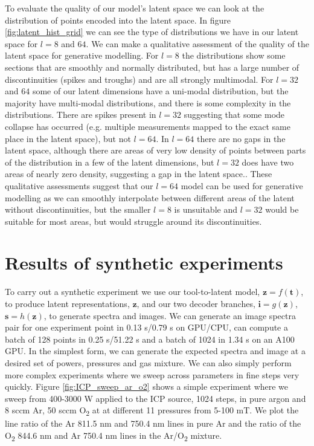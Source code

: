 \documentclass[10pt]{iopart}
\begin{document}
To evaluate the quality of our model's latent space we can look at the distribution of points encoded into the latent space. In figure \ref{fig:latent_hist_grid} we can see the type of distributions we have in our latent space for $l = 8$ and $64$. We can make a qualitative assessment of the quality of the latent space for generative modelling. For $l = 8$ the distributions show some sections that are smoothly and normally distributed, but has a large number of discontinuities (spikes and troughs) and are all strongly multimodal. For $l = 32$ and $64$ some of our latent dimensions have a uni-modal distribution, but the majority have multi-modal distributions, and there is some complexity in the distributions.  There are spikes present in $l = 32$ suggesting that some mode collapse has occurred (e.g. multiple measurements mapped to the exact same place in the latent space), but not $l = 64$. In $l = 64$ there are no gaps in the latent space, although there are areas of very low density of points between parts of the distribution in a few of the latent dimensions, but $l = 32$ does have two areas of nearly zero density, suggesting a gap in the latent space.. These qualitative assessments suggest that our $l = 64$ model can be used for generative modelling as we can smoothly interpolate between different areas of the latent without discontinuities, but the smaller $l = 8$ is unsuitable and $l = 32$ would be suitable for most areas, but would struggle around its discontinuities.

\section{Results of synthetic experiments}\label{synexp}

To carry out a synthetic experiment we use our tool-to-latent model, $\textbf{z} = f(\textbf{t})$, to produce latent representations, $\mathbf{z}$, and our two decoder branches, $\mathbf{i} = g(\mathbf{z})$,  $\mathbf{s} = h(\mathbf{z})$, to generate spectra and images. We can generate an image spectra pair for one experiment point in 0.13 s/0.79 s on GPU/CPU, can compute a batch of 128 points in 0.25 s/51.22 s and a batch of 1024 in 1.34 s on an A100 GPU. In the simplest form, we can generate the expected spectra and image at a desired set of powers, pressures and gas mixture. We can also simply perform more complex experiments where we sweep across parameters in fine steps very quickly. Figure \ref{fig:ICP_sweep_ar_o2} shows a simple experiment where we sweep from 400-3000 W applied to the ICP source, 1024 steps, in pure argon and 8 sccm Ar, 50 sccm O\textsubscript{2} at at different 11 pressures from 5-100 mT. We plot the line ratio of the Ar 811.5 nm and 750.4 nm lines in pure Ar and the ratio of the O\textsubscript{2} 844.6 nm and Ar 750.4 nm lines in the Ar/O\textsubscript{2} mixture.
\end{document}
